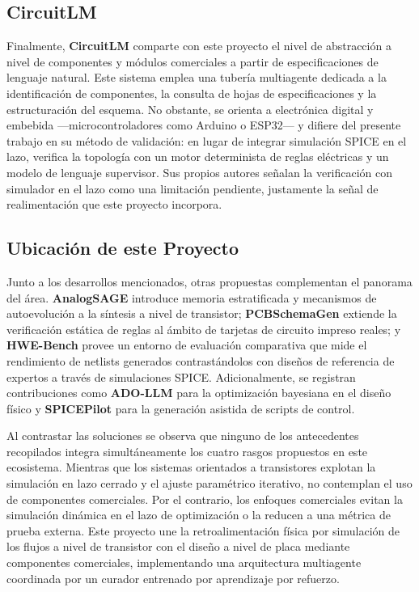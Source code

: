 \subsection*{CircuitLM}

Finalmente, \textbf{CircuitLM} \cite{circuitlm} comparte con este proyecto el nivel de abstracción a nivel de componentes y módulos comerciales a partir de especificaciones de lenguaje natural. Este sistema emplea una tubería multiagente dedicada a la identificación de componentes, la consulta de hojas de especificaciones y la estructuración del esquema. No obstante, se orienta a electrónica digital y embebida ---microcontroladores como Arduino o ESP32--- y difiere del presente trabajo en su método de validación: en lugar de integrar simulación SPICE en el lazo, verifica la topología con un motor determinista de reglas eléctricas y un modelo de lenguaje supervisor. Sus propios autores señalan la verificación con simulador en el lazo como una limitación pendiente, justamente la señal de realimentación que este proyecto incorpora.

\subsection*{Ubicación de este Proyecto}

Junto a los desarrollos mencionados, otras propuestas complementan el panorama del área. \textbf{AnalogSAGE} \cite{analogsage} introduce memoria estratificada y mecanismos de autoevolución a la síntesis a nivel de transistor; \textbf{PCBSchemaGen} \cite{pcbschemagen} extiende la verificación estática de reglas al ámbito de tarjetas de circuito impreso reales; y \textbf{HWE-Bench} \cite{hwebench} provee un entorno de evaluación comparativa que mide el rendimiento de netlists generados contrastándolos con diseños de referencia de expertos a través de simulaciones SPICE. Adicionalmente, se registran contribuciones como \textbf{ADO-LLM} \cite{adollm} para la optimización bayesiana en el diseño físico y \textbf{SPICEPilot} \cite{spicepilot} para la generación asistida de scripts de control.


Al contrastar las soluciones se observa que ninguno de los antecedentes recopilados integra simultáneamente los cuatro rasgos propuestos en este ecosistema. Mientras que los sistemas orientados a transistores explotan la simulación en lazo cerrado y el ajuste paramétrico iterativo, no contemplan el uso de componentes comerciales. Por el contrario, los enfoques comerciales evitan la simulación dinámica en el lazo de optimización o la reducen a una métrica de prueba externa. Este proyecto une la retroalimentación física por simulación de los flujos a nivel de transistor con el diseño a nivel de placa mediante componentes comerciales, implementando una arquitectura multiagente coordinada por un curador entrenado por aprendizaje por refuerzo.

